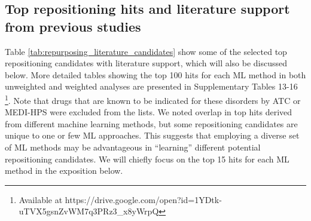   \subsection{Top repositioning hits and literature support from previous studies}
    Table \ref{tab:repurposing_literature_candidates} show some of the selected top repositioning candidates with literature support, which will also be discussed below. More detailed tables showing the top 100 hits for each ML method in both unweighted and weighted analyses are presented in Supplementary Tables 13-16 \footnote{Available at https://drive.google.com/open?id=1YDtk-uTVX5gsnZvWM7q3PRz3\_x8yWrpQ}. Note that drugs that are known to be indicated for these disorders by ATC or MEDI-HPS were excluded from the lists. We noted overlap in top hits derived from different machine learning methods, but some repositioning candidates are unique to one or few ML approaches. This suggests that employing a diverse set of ML methods may be advantageous in “learning” different potential repositioning candidates. We will chiefly focus on the top 15 hits for each ML method in the exposition below.

